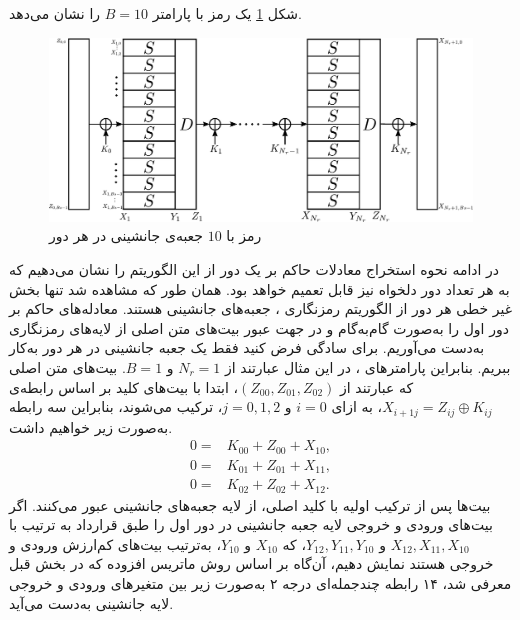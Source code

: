 شکل 
\ref{fig:ctc10}
یک رمز 
با پارامتر
$B = 10$
را نشان می‌دهد. 
\begin{figure}
	\centering
	\includegraphics[width=0.9\linewidth]{Images/CTC_10}
	\caption{رمز 
		با 
		$10$
		جعبه‌ی جانشینی در هر دور}
	\label{fig:ctc10}
\end{figure}
در ادامه نحوه استخراج معادلات حاکم بر یک‌ دور از این الگوریتم را نشان می‌دهیم که به هر تعداد دور دلخواه نیز قابل تعمیم خواهد بود. همان طور که مشاهده شد تنها بخش غیر خطی هر دور از الگوریتم رمزنگاری 
، 
جعبه‌های جانشینی هستند. معادله‌های حاکم بر دور اول را به‌صورت گام‌به‌گام و در جهت عبور بیت‌های متن اصلی از لایه‌های رمزنگاری به‌دست می‌آوریم.  برای سادگی فرض کنید فقط یک جعبه جانشینی در هر دور به‌کار ببریم. بنابراین پارامترهای 
، 
در این مثال عبارتند از 
$N_{r} = 1$
و 
$B = 1$.
بیت‌های متن اصلی که عبارتند از 
$(Z_{00},Z_{01},Z_{02})$، 
ابتدا با بیت‌های کلید بر اساس رابطه‌ی 
$X_{i+1j} = Z_{ij}\oplus K_{ij}$، 
به ازای 
$i = 0$
و 
$j = 0, 1, 2$، 
ترکیب می‌شوند، بنابراین سه رابطه به‌صورت زیر خواهیم داشت. 
\begin{align*}
	0 =& K_{00} + Z_{00} + X_{10},\\
	0 =& K_{01} + Z_{01} + X_{11},\\
	0 =& K_{02} + Z_{02} + X_{12}.
\end{align*}
بیت‌ها پس از ترکیب اولیه با کلید اصلی، از لایه‌ جعبه‌های جانشینی عبور می‌کنند. اگر بیت‌های ورودی و خروجی  لایه‌ جعبه‌ جانشینی در دور اول را طبق قرارداد به ترتیب با  
$X_{12},X_{11},X_{10}$ 
و 
$Y_{12}, Y_{11}, Y_{10}$، 
که 
$X_{10}$
و 
$Y_{10}$، 
به‌ترتیب بیت‌های کم‌ارزش ورودی و خروجی هستند نمایش دهیم، آن‌گاه بر اساس روش ماتریس افزوده که در بخش قبل معرفی شد،  ۱۴ رابطه‌ چندجمله‌ای درجه ۲  به‌صورت زیر بین متغیرهای ورودی و خروجی لایه جانشینی به‌دست می‌آید. 

